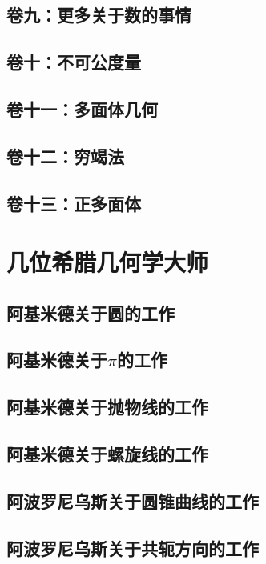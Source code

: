\documentclass[cn,fancy,blue,11pt]{elegantbook}
\begin{document}
\section{卷九：更多关于数的事情}

\section{卷十：不可公度量}

\section{卷十一：多面体几何}

\section{卷十二：穷竭法}

\section{卷十三：正多面体}

\chapter{几位希腊几何学大师}

\section{阿基米德关于圆的工作}

\section{阿基米德关于$\pi$的工作}

\section{阿基米德关于抛物线的工作}

\section{阿基米德关于螺旋线的工作}

\section{阿波罗尼乌斯关于圆锥曲线的工作}

\section{阿波罗尼乌斯关于共轭方向的工作}
\end{document}
